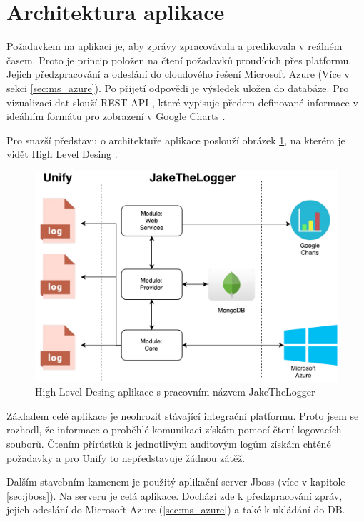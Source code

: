 \documentclass[thesis=M,czech]{FITthesis}[2012/10/20]
\newcommand{\tmpframe}[1]{\fbox{#1}}
\renewcommand{\tmpframe}[1]{#1}
\begin{document}
	\section{Architektura aplikace}
	Požadavkem na aplikaci je, aby zprávy zpracovávala a predikovala v reálném časem. Proto je princip položen na čtení požadavků proudících přes platformu. Jejich předzpracování a odeslání do cloudového řešení Microsoft Azure (Více v sekci \ref{sec:ms_azure}). Po přijetí odpovědi je výsledek uložen do databáze. Pro vizualizaci dat slouží REST API \cite{rest}, které vypisuje předem definované informace v ideálním formátu pro zobrazení v Google Charts \cite{googleCharts}.
	
	Pro snazší představu o architektuře aplikace poslouží obrázek \ref{fig:hld_architecture}, na kterém je vidět High Level Desing \cite{hld_johnson}.
	
	\begin{figure}[htb]\centering
		\tmpframe{\includegraphics[width=\textwidth]{./img/jake_HLD}}		
		\caption{High Level Desing aplikace s pracovním názvem JakeTheLogger}
		\label{fig:hld_architecture}
	\end{figure}

	Základem celé aplikace je neohrozit stávající integrační platformu. Proto jsem se rozhodl, že informace o proběhlé komunikaci získám pomocí čtení logovacích souborů.
	Čtením přírůstků k jednotlivým auditovým logům získám chtěné požadavky a pro Unify to nepředstavuje žádnou zátěž.
	
	Dalším stavebním kamenem je použitý aplikační server Jboss (více v kapitole \ref{sec:jboss}). Na serveru je celá aplikace. Dochází zde k předzpracování zpráv, jejich odeslání do Microsoft Azure (\ref{sec:ms_azure}) a také k ukládání do DB.
	
\end{document}
